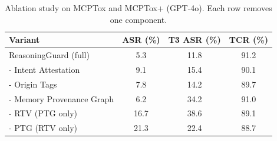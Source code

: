 \begin{table}[t]
\centering\small
\begin{tabular}{lccc}
\toprule
\textbf{Variant} & \textbf{ASR (\%)} & \textbf{T3 ASR (\%)} & \textbf{TCR (\%)} \\
\midrule
ReasoningGuard (full) & 5.3 & 11.8 & 91.2 \\
- Intent Attestation & 9.1 & 15.4 & 90.1 \\
- Origin Tags & 7.8 & 14.2 & 89.7 \\
- Memory Provenance Graph & 6.2 & 34.2 & 91.0 \\
- RTV (PTG only) & 16.7 & 38.6 & 89.1 \\
- PTG (RTV only) & 21.3 & 22.4 & 88.7 \\
\bottomrule
\end{tabular}
\caption{Ablation study on MCPTox and MCPTox+ (GPT-4o). Each row removes one component.}
\label{tab:ablation}
\end{table}